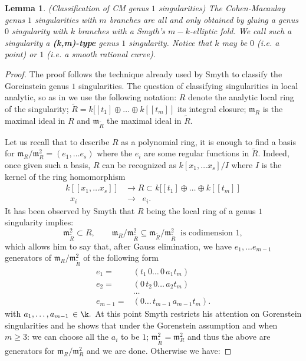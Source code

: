 \documentclass[11pt]{amsart}
\theoremstyle{plain}
\newtheorem{lem}[thm]{Lemma}
\theoremstyle{definition}
\begin{document}
\begin{lem}\label{lem:classificationsing}(Classification of CM genus $1$ singularities)
The Cohen-Macaulay genus $1$ singularities with $m$ branches are all and only obtained by gluing a genus $0$ singularity with $k$ branches with a Smyth's $m-k$-elliptic fold. We call such a singularity a \textbf{(k,m)-type} genus $1$ singularity.
Notice that $k$ may be $0$ (i.e. a point) or $1$ (i.e. a smooth rational curve).
\end{lem}
\begin{proof}
The proof follows the technique already used by Smyth \cite[Appendix~A]{SMY1} to classify the Goreinstein genus $1$ singularities. The question of classifying singularities in local analytic, so as in \cite[Appendix~A]{SMY1} we use the following notation:
$R$ denote the analytic local ring of the singularity; 
$\widetilde{R}=k[[t_1]\oplus\dots\oplus k[[t_m]]$ its integral closure; $\mathfrak{m}_R$ is the maximal ideal in $R$  and $\mathfrak{m}_{\widetilde{R}}$ the maximal ideal in $\widetilde{R}.$

Let us recall that to describe $R$ as a polynomial ring, it is enough to find a basis for $\mathfrak{m}_R/\mathfrak{m}^2_R=(e_1,\dots e_s)$ where the $e_i$ are some regular functions in $\widetilde{R}.$ Indeed, once given such a basis, $R$ can be recognized as $k[x_1,\dots x_s]/I$ where $I$ is the kernel of the ring homomorphism
\begin{align}\label{eq:singularity}
k[[x_1,\dots x_s]]&\rightarrow R\subset k[[t_1]\oplus\dots\oplus k[[t_m]]\\
\;\;x_i\;\; &\rightarrow \;\; e_i.\;\;
\end{align}
It has been observed by Smyth \cite[Proposition~A.3]{SMY1} that $R$ being the local ring of a genus $1$ singularity implies:
\[\mathfrak{m}^2_{\widetilde{R}}\subset R,\qquad \mathfrak{m}_R/\mathfrak{m}^2_{\widetilde{R}}\subseteq \mathfrak{m}_{\widetilde{R}}/\mathfrak{m}^2_{\widetilde{R}}\;\;\text{is codimension $1$},\]
which allows him to say that, after Gauss elimination, we have $e_1,\dots e_{m-1}$ generators of $\mathfrak{m}_R/\mathfrak{m}^2_{\widetilde{R}}$ of the following form
\begin{align*}
e_1=& (t_1 \,0\dots\,0\, a_1 t_m)\\
e_2=&( 0\,t_2\,0\dots\, a_2 t_m)\\
&\dots\\
e_{m-1}=&(0\dots\,t_{m-1}\, a_{m-1}t_m ).
\end{align*}
with $a_{1},\dots, a_{m-1}\,\in \k.$ At this point Smyth restricts his attention on Gorenstein singularities and he shows that under the Gorenstein assumption and when $m\geq 3$: we can choose all the $a_i$ to be $1$; $\mathfrak{m}^2_{\widetilde{R}}=\mathfrak{m}^2_{R}$ and thus the above are generators for $\mathfrak{m}_R/\mathfrak{m}^2_R$ and we are  done.
Otherwise we have:


\end{proof}
\end{document}
